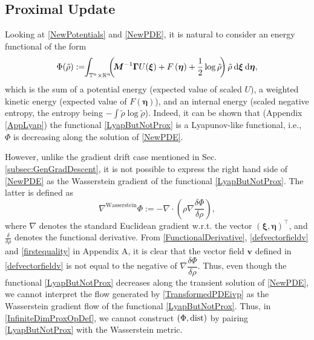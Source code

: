 \documentclass[10pt,twocolumn]{IEEEtran}
\newcommand{\differential}{{\rm{d}}}
\begin{document}
\subsection{Proximal Update}\label{subsec:ProxUpdate}
Looking at \eqref{NewPotentials} and \eqref{NewPDE}, it is natural to consider an energy functional of the form
\begin{align}
\Phi(\tilde{\rho}) := \!\!\displaystyle\int_{\mathbb{T}^{n}\times\mathbb{R}^{n}}\!\!\!\left(\!\bm{M}^{-1}\bm{\Gamma}U(\bm{\xi})+ F\left(\bm{\eta}\right) + \frac{1}{2}\log\tilde{\rho}\!\right)\tilde{\rho}\:\differential\bm{\xi}\:\differential\bm{\eta},
\label{LyapButNotProx}	
\end{align}
which is the sum of a potential energy (expected value of scaled $U$), a weighted kinetic energy (expected value of $F\left(\bm{\eta}\right)$), and an internal energy (scaled negative entropy, the entropy being $-\int\tilde{\rho}\log\tilde{\rho}$). Indeed, it can be shown that (Appendix \ref{AppLyap}) the functional \eqref{LyapButNotProx} is a Lyapunov-like functional, i.e., $\Phi$ is decreasing along the solution of \eqref{NewPDE}.

However, unlike the gradient drift case mentioned in Sec. \ref{subsec:GenGradDescent}, it is not possible to express the right hand side of \eqref{NewPDE} as the Wasserstein gradient of the functional \eqref{LyapButNotProx}. The latter is defined as \cite[Ch. 8]{ambrosio2008gradient} 
$$\nabla^{\text{Wasserstein}}\Phi := -\nabla\cdot\left(\rho\nabla\dfrac{\delta\Phi}{\delta\rho}\right),$$
where $\nabla$ denotes the standard Euclidean gradient w.r.t. the vector $(\bm{\xi},\bm{\eta})^{\top}$, and $\frac{\delta}{\delta\rho}$ denotes the functional derivative. From \eqref{FunctionalDerivative}, \eqref{defvectorfieldv} and \eqref{firstequality} in Appendix A, it is clear that the vector field $\bm{v}$ defined in \eqref{defvectorfieldv} is not equal to the negative of $\nabla\dfrac{\delta\Phi}{\delta\rho}$. Thus, even though the functional \eqref{LyapButNotProx} decreases along the transient solution of \eqref{NewPDE}, we cannot interpret the flow generated by \eqref{TransformedPDEivp} as the Wasserstein gradient flow of the functional \eqref{LyapButNotProx}. Thus, in \eqref{InfiniteDimProxOpDef}, we cannot construct $(\Phi,{\rm{dist}})$ by pairing \eqref{LyapButNotProx} with the Wasserstein metric.
\end{document}
